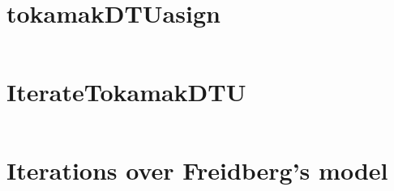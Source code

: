 \appendix
\appendixpage
\addappheadtotoc
\section{tokamakDTU\textunderscore asign}\label{tokamakDTU_asign_1}
\inputminted[bgcolor=Black,linenos=true]{matlab}{Listings/tokamakDTU_asign_1.m}\newpage
\section{IterateTokamakDTU}\label{IterateTokamakDTU}
\inputminted[bgcolor=Black,linenos=true]{matlab}{Listings/IterateTokamakDTU.m}\newpage
\section{Iterations over Freidberg's model}\label{ITFR}
